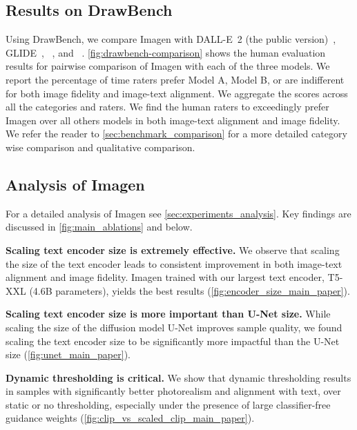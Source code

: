 \subsection{Results on DrawBench}

\label{sec:experiments_drawbench}

Using DrawBench, we compare Imagen with \mbox{DALL-E 2} (the public version)~\cite{ramesh-dalle2}, \mbox{GLIDE}~\cite{nichol-glide}, \href{https://github.com/CompVis/latent-diffusion}{\color{black}{Latent Diffusion}}~\cite{rombach-cvpr-2022}, and \href{https://github.com/EleutherAI/vqgan-clip}{\color{black}{CLIP-guided VQ-GAN}}~\cite{crowson2022vqgan}. 
\ref{fig:drawbench-comparison} shows the human evaluation results for pairwise comparison of Imagen with each of the three models. We report the percentage of time raters prefer Model A, Model B, or are indifferent for both image fidelity and image-text alignment. We aggregate the scores across all the categories and raters. We find the human raters to exceedingly prefer Imagen over all others models in both image-text alignment and image fidelity. We refer the reader to \ref{sec:benchmark_comparison} for a more detailed category wise comparison and qualitative comparison. 

\subsection{Analysis of Imagen}

\label{sec:short_further_analysis}
For a detailed analysis of Imagen see \ref{sec:experiments_analysis}. Key findings are discussed in \ref{fig:main_ablations} and below.

\textbf{Scaling text encoder size is extremely effective.} We observe that scaling the size of the text encoder leads to consistent improvement in both image-text alignment and image fidelity. Imagen trained with our largest text encoder, T5-XXL (4.6B parameters), yields the best results (\ref{fig:encoder_size_main_paper}).

\textbf{Scaling text encoder size is more important than U-Net size.} While scaling the size of the diffusion model U-Net improves sample quality, we found scaling the text encoder size to be significantly more impactful than the U-Net size (\ref{fig:unet_main_paper}).

\textbf{Dynamic thresholding is critical.} We show that dynamic thresholding results in samples with significantly better photorealism and alignment with text, over static or no thresholding, especially under the presence of large classifier-free guidance weights (\ref{fig:clip_vs_scaled_clip_main_paper}).

